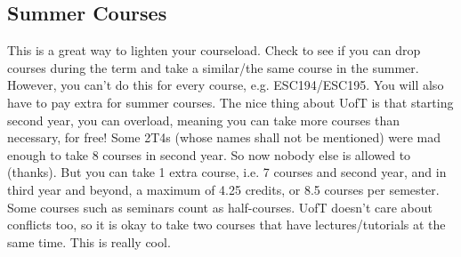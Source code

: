 \subsection{Summer Courses}

This is a great way to lighten your courseload. Check to see if you can drop courses during the term and take a similar/the same course in the summer. However, you can't do this for every course, e.g. ESC194/ESC195. You will also have to pay extra for summer courses. The nice thing about UofT is that starting second year, you can overload, meaning you can take more courses than necessary, for free! Some 2T4s (whose names shall not be mentioned) were mad enough to take 8 courses in second year. So now nobody else is allowed to (thanks). But you can take 1 extra course, i.e. 7 courses and second year, and in third year and beyond, a maximum of 4.25 credits, or 8.5 courses per semester. Some courses such as seminars count as half-courses. UofT doesn't care about conflicts too, so it is okay to take two courses that have lectures/tutorials at the same time. This is really cool.

